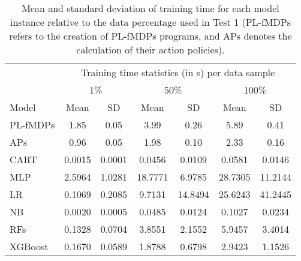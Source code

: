 \begin{table}[htbp!]
\caption{Mean and standard deviation of training time for each model instance relative to the data percentage used in Test 1 (PL-fMDPs refers to the creation of PL-fMDPs programs, and APs denotes the calculation of their action policies).}
\label{tab:training_exp1}
\begin{tabular}{lcccccc}
\toprule
& \multicolumn{6}{c}{Training time statistics (in s) per data sample} \\
\cmidrule(lr){2-7}
& \multicolumn{2}{c}{1\%} & \multicolumn{2}{c}{50\%} & \multicolumn{2}{c}{100\%} \\
\cmidrule(lr){2-7}
Model & Mean & SD & Mean & SD & Mean & SD \\
\midrule
PL-fMDPs & 1.85 & 0.05 & 3.99 & 0.26 & 5.89 & 0.41 \\
APs & 0.96 & 0.05 & 1.98 & 0.10 & 2.33 & 0.16 \\
CART & 0.0015 & 0.0001 & 0.0456 & 0.0109 & 0.0581 & 0.0146 \\
MLP & 2.5964 & 1.0281 & 18.7771 & 6.9785 & 28.7305 & 11.2144 \\
LR & 0.1069 & 0.2085 & 9.7131 & 14.8494 & 25.6243 & 41.2445 \\
NB & 0.0020 & 0.0005 & 0.0485 & 0.0124 & 0.1027 & 0.0234 \\
RFs & 0.1328 & 0.0704 & 3.8551 & 2.1552 & 5.9457 & 3.4014 \\
XGBoost & 0.1670 & 0.0589 & 1.8788 & 0.6798 & 2.9423 & 1.1526 \\
\bottomrule
\end{tabular}
\end{table}